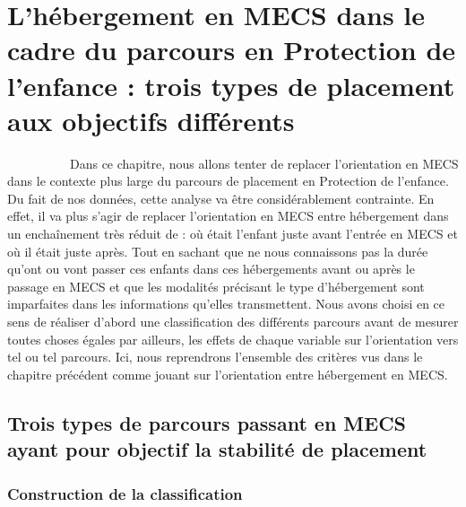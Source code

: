 \documentclass[
  12,
  a4paper,
]{report}
\author{}
\date{\vspace{-2.5em}}
\begin{document}
\hypertarget{lhuxe9bergement-en-mecs-dans-le-cadre-du-parcours-en-protection-de-lenfance-trois-types-de-placement-aux-objectifs-diffuxe9rents}{%
\chapter{L'hébergement en MECS dans le cadre du parcours en Protection
de l'enfance : trois types de placement aux objectifs
différents}\label{lhuxe9bergement-en-mecs-dans-le-cadre-du-parcours-en-protection-de-lenfance-trois-types-de-placement-aux-objectifs-diffuxe9rents}}

~~~~~~~~~~Dans ce chapitre, nous allons tenter de replacer l'orientation
en MECS dans le contexte plus large du parcours de placement en
Protection de l'enfance. Du fait de nos données, cette analyse va être
considérablement contrainte. En effet, il va plus s'agir de replacer
l'orientation en MECS entre hébergement dans un enchaînement très réduit
de : où était l'enfant juste avant l'entrée en MECS et où il était juste
après. Tout en sachant que ne nous connaissons pas la durée qu'ont ou
vont passer ces enfants dans ces hébergements avant ou après le passage
en MECS et que les modalités précisant le type d'hébergement sont
imparfaites dans les informations qu'elles transmettent. Nous avons
choisi en ce sens de réaliser d'abord une classification des différents
parcours avant de mesurer toutes choses égales par ailleurs, les effets
de chaque variable sur l'orientation vers tel ou tel parcours. Ici, nous
reprendrons l'ensemble des critères vus dans le chapitre précédent comme
jouant sur l'orientation entre hébergement en MECS.

\hypertarget{trois-types-de-parcours-passant-en-mecs-ayant-pour-objectif-la-stabilituxe9-de-placement}{%
\section{Trois types de parcours passant en MECS ayant pour objectif la
stabilité de
placement}\label{trois-types-de-parcours-passant-en-mecs-ayant-pour-objectif-la-stabilituxe9-de-placement}}

\hypertarget{construction-de-la-classification}{%
\subsection{Construction de la
classification}\label{construction-de-la-classification}}
\end{document}
